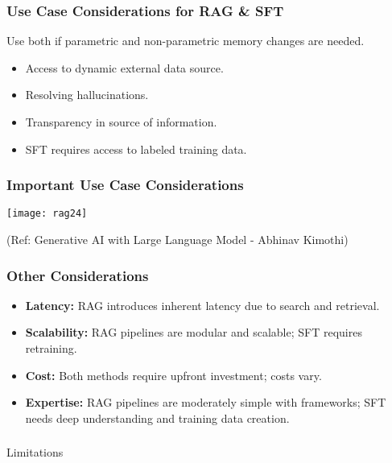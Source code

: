 \begin{frame}[fragile]\frametitle{Use Case Considerations for RAG \& SFT}
Use both if parametric and non-parametric memory changes are needed.

\begin{itemize}
  \item Access to dynamic external data source.
  \item Resolving hallucinations.
  \item Transparency in source of information.
  \item SFT requires access to labeled training data.
\end{itemize}
\end{frame}

\begin{frame}[fragile]\frametitle{Important Use Case Considerations}


		\begin{center}
		\texttt{[image: rag24]}
		\end{center}

{\tiny (Ref: Generative AI with Large Language Model - Abhinav  Kimothi)}

\end{frame}

\begin{frame}[fragile]\frametitle{Other Considerations}
\begin{itemize}
  \item \textbf{Latency:} RAG introduces inherent latency due to search and retrieval.
  \item \textbf{Scalability:} RAG pipelines are modular and scalable; SFT requires retraining.
  \item \textbf{Cost:} Both methods require upfront investment; costs vary.
  \item \textbf{Expertise:} RAG pipelines are moderately simple with frameworks; SFT needs deep understanding and training data creation.
\end{itemize}
\end{frame}

\begin{frame}[fragile]\frametitle{}
\begin{center}
{\Large Limitations}
\end{center}
\end{frame}

